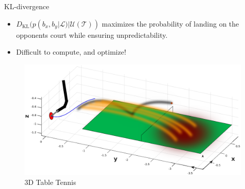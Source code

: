 \documentclass[handout]{beamer}
\newcommand{\court}{\mathcal{T}} %
\newcommand{\landEvent}{\mathcal{L}} %
\newcommand{\KL}{D_{\mathrm{KL}}}
\begin{document}
%
%
\begin{frame}{KL-divergence}
\begin{itemize}
%
\item $\KL(p(b_x,b_y|\landEvent)|\mathcal{U}(\court))$ maximizes the probability of landing on the opponents court while ensuring unpredictability.
\item Difficult to compute, and optimize!
\end{itemize}
\begin{figure}[t!]
\center
\includegraphics[scale=0.3]{tableTennis3DwithUncertainty.eps}			
\caption{3D Table Tennis}
\end{figure}
\end{frame}
%
\end{document}
